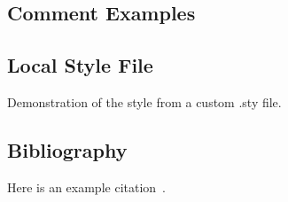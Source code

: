\documentclass{article}
\begin{document}
\subsection{Comment Examples}
\begin{comment}
This entire block is a comment and will not appear in the compiled PDF.
It demonstrates usage of the comment environment.
\end{comment}

\subsection{Local Style File}
Demonstration of the  style from a custom .sty file.

\subsection{Bibliography}
Here is an example citation~\cite{example2023}.

\printbibliography
\end{document}
